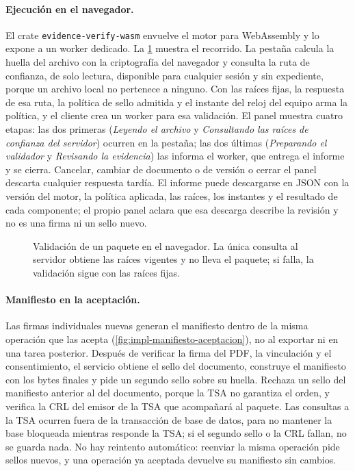 \paragraph{Ejecución en el navegador.} El crate \texttt{evidence-verify-wasm} envuelve el motor para WebAssembly y lo expone a un worker dedicado. La \cref{fig:impl-validador-secuencia} muestra el recorrido. La pestaña calcula la huella del archivo con la criptografía del navegador y consulta la ruta de confianza, de solo lectura, disponible para cualquier sesión y sin expediente, porque un archivo local no pertenece a ninguno. Con las raíces fijas, la respuesta de esa ruta, la política de sello admitida y el instante del reloj del equipo arma la política, y el cliente crea un worker para esa validación. El panel muestra cuatro etapas: las dos primeras (\emph{Leyendo el archivo} y \emph{Consultando las raíces de confianza del servidor}) ocurren en la pestaña; las dos últimas (\emph{Preparando el validador} y \emph{Revisando la evidencia}) las informa el worker, que entrega el informe y se cierra. Cancelar, cambiar de documento o de versión o cerrar el panel descarta cualquier respuesta tardía. El informe puede descargarse en JSON con la versión del motor, la política aplicada, las raíces, los instantes y el resultado de cada componente; el propio panel aclara que esa descarga describe la revisión y no es una firma ni un sello nuevo.

\begin{figure}[!tb]
  \centering
  
  \caption{Validación de un paquete en el navegador. La única consulta al servidor obtiene las raíces vigentes y no lleva el paquete; si falla, la validación sigue con las raíces fijas.}
  \label{fig:impl-validador-secuencia}
\end{figure}

\paragraph{Manifiesto en la aceptación.} Las firmas individuales nuevas generan el manifiesto dentro de la misma operación que las acepta (\cref{fig:impl-manifiesto-aceptacion}), no al exportar ni en una tarea posterior. Después de verificar la firma del PDF, la vinculación y el consentimiento, el servicio obtiene el sello del documento, construye el manifiesto con los bytes finales y pide un segundo sello sobre su huella. Rechaza un sello del manifiesto anterior al del documento, porque la TSA no garantiza el orden, y verifica la CRL del emisor de la TSA que acompañará al paquete. Las consultas a la TSA ocurren fuera de la transacción de base de datos, para no mantener la base bloqueada mientras responde la TSA; si el segundo sello o la CRL fallan, no se guarda nada. No hay reintento automático: reenviar la misma operación pide sellos nuevos, y una operación ya aceptada devuelve su manifiesto sin cambios.

